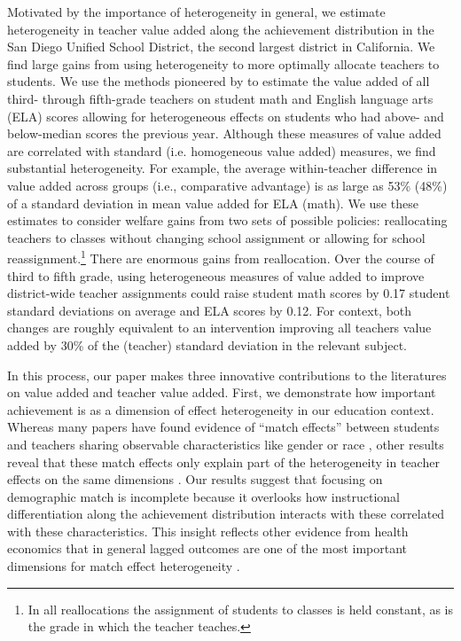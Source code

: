 \documentclass[12pt]{article}
\theoremstyle{definition}
\theoremstyle{definition}
\theoremstyle{definition}
\theoremstyle{definition}
\begin{document}
Motivated by the importance of heterogeneity in general, we estimate heterogeneity in teacher value added along the achievement distribution in the San Diego Unified School District, the second largest district in California. We find large gains from using heterogeneity to more optimally allocate teachers to students. We use the methods pioneered by \citet{Delgado2020} to estimate the value added of all third- through fifth-grade teachers on student math and English language arts (ELA) scores allowing for heterogeneous effects on students who had above- and below-median scores the previous year. Although these measures of value added are correlated with standard (i.e. homogeneous value added) measures, we find substantial heterogeneity. For example, the average within-teacher difference in value added  across groups (i.e., comparative advantage) is as large as 53\% (48\%) of a standard deviation in mean value added for ELA (math). We use these estimates to consider welfare gains from two sets of possible policies: reallocating teachers to classes without changing school assignment or allowing for school reassignment.\footnote{In all reallocations the assignment of students to classes is held constant, as is the grade in which the teacher teaches.} There are enormous gains from reallocation. Over the course of third to fifth grade, using heterogeneous measures of value added to improve district-wide teacher assignments could raise student math scores by 0.17 student standard deviations on average and ELA scores by 0.12. For context, both changes are roughly equivalent to an intervention improving all teachers value added by 30\% of the (teacher) standard deviation in the relevant subject.

In this process, our paper makes three innovative contributions to the literatures on value added and teacher value added. First, we demonstrate how important achievement is as a dimension of effect heterogeneity in our education context. Whereas many papers have found evidence of ``match effects'' between students and teachers sharing  observable characteristics like gender or race \citep{dee2005teacher,delhommer2019highschool}, other results reveal that these match effects only explain part of the heterogeneity in teacher effects on the same dimensions \citep{Delgado2020}. Our results suggest that focusing on demographic match is incomplete because it overlooks how instructional differentiation along the achievement distribution \citep[well documented in the education literature][]{} interacts with these correlated with these characteristics. This insight reflects other evidence from health economics that in general lagged outcomes are one of the most important dimensions for match effect heterogeneity \citep[as in][]{Dahlstrand2022defying}.
\end{document}
